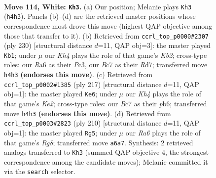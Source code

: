 \documentclass[11pt]{article}
\begin{document}
\clearpage

\begin{figure}[p]\centering
\begin{subfigure}{0.46\textwidth}\centering
\resizebox{\linewidth}{!}{%
\newchessgame
\chessboard[
  setfen={6r1/2B4k/R7/8/P6K/8/8/8 w - - 1 114},
  showmover=false,
  pgfstyle=straightmove, color=movearrow, markmove={h4-h3}
]}
\caption{}
\end{subfigure}\hfill
\begin{subfigure}{0.46\textwidth}\centering
\resizebox{\linewidth}{!}{%
\newchessgame
\chessboard[
  setfen={8/P2R4/r7/1k6/8/2P5/1K6/8 w - - 23 116},
  showmover=false,
  pgfstyle=straightmove, color=movearrow, markmove={b2-b1}
]}
\caption{}
\end{subfigure}
\\[4pt]
\begin{subfigure}{0.46\textwidth}\centering
\resizebox{\linewidth}{!}{%
\newchessgame
\chessboard[
  setfen={8/4kp2/1P6/1K6/8/3R4/2r5/8 b - - 6 109},
  showmover=false,
  pgfstyle=straightmove, color=movearrow, markmove={e7-e6}
]}
\caption{}
\end{subfigure}\hfill
\begin{subfigure}{0.46\textwidth}\centering
\resizebox{\linewidth}{!}{%
\newchessgame
\chessboard[
  setfen={6R1/4k3/4p3/8/r7/3K2B1/8/8 w - - 7 106},
  showmover=false,
  pgfstyle=straightmove, color=movearrow, markmove={g8-g5}
]}
\caption{}
\end{subfigure}
\caption{\textbf{Move 114, White: \texttt{Kh3}.} (a) Our position; Melanie plays \texttt{Kh3} (\texttt{h4h3}). Panels (b)--(d) are the retrieved master positions whose correspondence most drove this move (highest QAP objective among those that transfer to it). (b) Retrieved from \texttt{ccrl\_top\_p0000\#2307} (ply 230) [structural distance $d$=11, QAP obj=3]: the master played \texttt{Kb1}; under $\mu$ our \emph{Kh4} plays the role of that game's \emph{Kb2}; cross-type roles: our \emph{R}a6 as their \emph{P}c3, our \emph{B}c7 as their \emph{R}d7; transferred move \texttt{h4h3} \textbf{(endorses this move)}. (c) Retrieved from \texttt{ccrl\_top\_p0002\#1385} (ply 217) [structural distance $d$=11, QAP obj=1]: the master played \texttt{Ke6}; under $\mu$ our \emph{Kh4} plays the role of that game's \emph{Ke2}; cross-type roles: our \emph{B}c7 as their \emph{p}b6; transferred move \texttt{h4h3} \textbf{(endorses this move)}. (d) Retrieved from \texttt{ccrl\_top\_p0003\#2823} (ply 210) [structural distance $d$=11, QAP obj=1]: the master played \texttt{Rg5}; under $\mu$ our \emph{Ra6} plays the role of that game's \emph{Rg8}; transferred move \texttt{a6a7}. Synthesis: 2 retrieved analogs transferred to \texttt{Kh3} (summed QAP objective 4, the strongest correspondence among the candidate moves); Melanie committed it via the \texttt{search} selector.}
\label{fig:thought-m226}
\end{figure}
\end{document}
